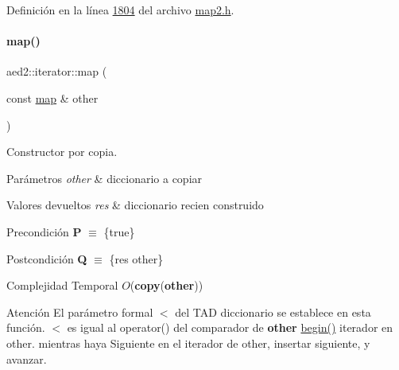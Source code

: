 Definición en la línea \hyperlink{map2_8h_source_l01804}{1804} del archivo \hyperlink{map2_8h_source}{map2.\+h}.

\mbox{\label{classaed2_1_1iterator_aee42bcaf809b71168f4266e1d05971e2_aee42bcaf809b71168f4266e1d05971e2}} 
\paragraph{\texorpdfstring{map()}{map()}\hspace{0.1cm}{\footnotesize\ttfamily [2/3]}}
{\footnotesize\ttfamily aed2\+::iterator\+::map (\begin{DoxyParamCaption}\item[{const \hyperlink{classaed2_1_1map}{map} \&}]{other }\end{DoxyParamCaption})\hspace{0.3cm}{\ttfamily [inline]}}



Constructor por copia. 


\begin{DoxyParams}{Parámetros}
{\em other} & diccionario a copiar \\
\hline
\end{DoxyParams}

\begin{DoxyRetVals}{Valores devueltos}
{\em res} & diccionario recien construido\\
\hline
\end{DoxyRetVals}
\begin{DoxyPrecond}{Precondición}
{\bfseries P} $\equiv$ \{true\} 
\end{DoxyPrecond}
\begin{DoxyPostcond}{Postcondición}
{\bfseries Q} $\equiv$ \{res  other\}
\end{DoxyPostcond}

\begin{DoxyDescription}
\item[Complejidad Temporal]$O$({\bfseries copy}({\bfseries other}))
\end{DoxyDescription}

\begin{DoxyAttention}{Atención}
El parámetro formal $<$ del T\+AD diccionario se establece en esta función. $<$ es igual al operator() del comparador de {\bfseries other} \hyperlink{classaed2_1_1iterator_af8901de173468531c58458b581d345a6_af8901de173468531c58458b581d345a6}{begin()} iterador en other. mientras haya Siguiente en el iterador de other, insertar siguiente, y avanzar. 
\end{DoxyAttention}



